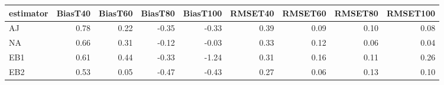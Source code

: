 \begin{table}[ht]
\centering
\begin{tabular}{lrrrrrrrr}
  \toprule
estimator & BiasT40 & BiasT60 & BiasT80 & BiasT100 & RMSET40 & RMSET60 & RMSET80 & RMSET100 \\ 
  \midrule
AJ & 0.78 & 0.22 & -0.35 & -0.33 & 0.39 & 0.09 & 0.10 & 0.08 \\ 
  NA & 0.66 & 0.31 & -0.12 & -0.03 & 0.33 & 0.12 & 0.06 & 0.04 \\ 
  EB1 & 0.61 & 0.44 & -0.33 & -1.24 & 0.31 & 0.16 & 0.11 & 0.26 \\ 
  EB2 & 0.53 & 0.05 & -0.47 & -0.43 & 0.27 & 0.06 & 0.13 & 0.10 \\ 
   \bottomrule
\end{tabular}
\end{table}
